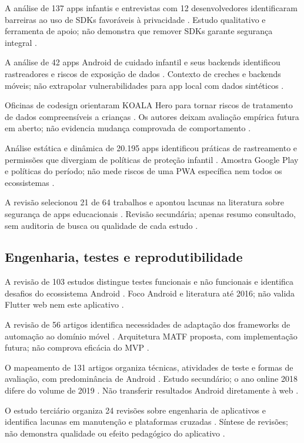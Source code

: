 A análise de 137 apps infantis e entrevistas com 12 desenvolvedores identificaram barreiras ao uso de SDKs favoráveis à privacidade \citep{OS13}. Estudo qualitativo e ferramenta de apoio; não demonstra que remover SDKs garante segurança integral \citep{OS13}.

A análise de 42 apps Android de cuidado infantil e seus backends identificou rastreadores e riscos de exposição de dados \citep{OS14}. Contexto de creches e backends móveis; não extrapolar vulnerabilidades para app local com dados sintéticos \citep{OS14}.

Oficinas de codesign orientaram KOALA Hero para tornar riscos de tratamento de dados compreensíveis a crianças \citep{OS15}. Os autores deixam avaliação empírica futura em aberto; não evidencia mudança comprovada de comportamento \citep{OS15}.

Análise estática e dinâmica de 20.195 apps identificou práticas de rastreamento e permissões que divergiam de políticas de proteção infantil \citep{OS17}. Amostra Google Play e políticas do período; não mede riscos de uma PWA específica nem todos os ecossistemas \citep{OS17}.

A revisão selecionou 21 de 64 trabalhos e apontou lacunas na literatura sobre segurança de apps educacionais \citep{OS18}. Revisão secundária; apenas resumo consultado, sem auditoria de busca ou qualidade de cada estudo \citep{OS18}.

\subsection{Engenharia, testes e reprodutibilidade}

A revisão de 103 estudos distingue testes funcionais e não funcionais e identifica desafios do ecossistema Android \citep{eng01}. Foco Android e literatura até 2016; não valida Flutter web nem este aplicativo \citep{eng01}.

A revisão de 56 artigos identifica necessidades de adaptação dos frameworks de automação ao domínio móvel \citep{eng02}. Arquitetura MATF proposta, com implementação futura; não comprova eficácia do MVP \citep{eng02}.

O mapeamento de 131 artigos organiza técnicas, atividades de teste e formas de avaliação, com predominância de Android \citep{eng03}. Estudo secundário; o ano online 2018 difere do volume de 2019 \citep{eng03}. Não transferir resultados Android diretamente à web \citep{eng03}.

O estudo terciário organiza 24 revisões sobre engenharia de aplicativos e identifica lacunas em manutenção e plataformas cruzadas \citep{eng04}. Síntese de revisões; não demonstra qualidade ou efeito pedagógico do aplicativo \citep{eng04}.

